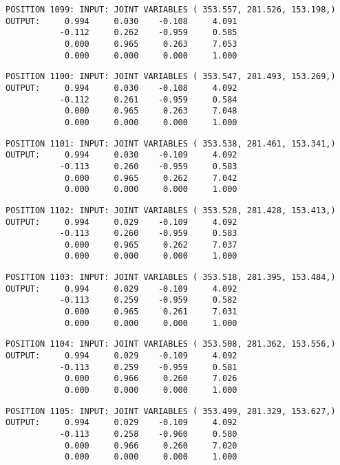 \begin{verbatim}
POSITION 1099: INPUT: JOINT VARIABLES ( 353.557, 281.526, 153.198,)
OUTPUT:     0.994     0.030    -0.108     4.091
           -0.112     0.262    -0.959     0.585
            0.000     0.965     0.263     7.053
            0.000     0.000     0.000     1.000
\end{verbatim} \pagebreak[1]\begin{verbatim}
POSITION 1100: INPUT: JOINT VARIABLES ( 353.547, 281.493, 153.269,)
OUTPUT:     0.994     0.030    -0.108     4.092
           -0.112     0.261    -0.959     0.584
            0.000     0.965     0.263     7.048
            0.000     0.000     0.000     1.000
\end{verbatim} \pagebreak[1]\begin{verbatim}
POSITION 1101: INPUT: JOINT VARIABLES ( 353.538, 281.461, 153.341,)
OUTPUT:     0.994     0.030    -0.109     4.092
           -0.113     0.260    -0.959     0.583
            0.000     0.965     0.262     7.042
            0.000     0.000     0.000     1.000
\end{verbatim} \pagebreak[1]\begin{verbatim}
POSITION 1102: INPUT: JOINT VARIABLES ( 353.528, 281.428, 153.413,)
OUTPUT:     0.994     0.029    -0.109     4.092
           -0.113     0.260    -0.959     0.583
            0.000     0.965     0.262     7.037
            0.000     0.000     0.000     1.000
\end{verbatim} \pagebreak[1]\begin{verbatim}
POSITION 1103: INPUT: JOINT VARIABLES ( 353.518, 281.395, 153.484,)
OUTPUT:     0.994     0.029    -0.109     4.092
           -0.113     0.259    -0.959     0.582
            0.000     0.965     0.261     7.031
            0.000     0.000     0.000     1.000
\end{verbatim} \pagebreak[1]\begin{verbatim}
POSITION 1104: INPUT: JOINT VARIABLES ( 353.508, 281.362, 153.556,)
OUTPUT:     0.994     0.029    -0.109     4.092
           -0.113     0.259    -0.959     0.581
            0.000     0.966     0.260     7.026
            0.000     0.000     0.000     1.000
\end{verbatim} \pagebreak[1]\begin{verbatim}
POSITION 1105: INPUT: JOINT VARIABLES ( 353.499, 281.329, 153.627,)
OUTPUT:     0.994     0.029    -0.109     4.092
           -0.113     0.258    -0.960     0.580
            0.000     0.966     0.260     7.020
            0.000     0.000     0.000     1.000
\end{verbatim} \pagebreak[1]\begin{verbatim}

\end{verbatim}
